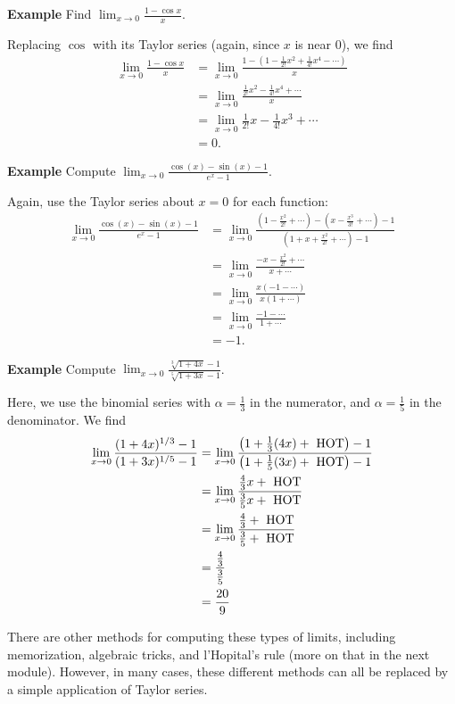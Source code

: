 \documentclass[twoside,openright,titlepage,a4paper]{book}
\begin{document}
\begin{sloppypar}
\textbf{Example} Find $\displaystyle \lim_{x\rightarrow 0} \frac{1-\cos x}{x}$. 
\begin{examplebox}
Replacing $\cos$ with its Taylor series (again, since $x$ is near 0), we find
\begin{align*} 
\lim_{x \rightarrow 0} \frac{1-\cos x}{x} &= \lim_{x \rightarrow 0} \frac{1-\left(1-\frac{1}{2!}x^2 + \frac{1}{4!}x^4 - \dotsb \right)}{x} \\
&= \lim_{x \rightarrow 0} \frac{\frac{1}{2!}x^2 - \frac{1}{4!}x^4 + \dotsb}{x} \\
&= \lim_{x \rightarrow 0} \frac{1}{2!}x - \frac{1}{4!}x^3 + \dotsb \\
&= 0. 
\end{align*}
\end{examplebox}

\textbf{Example} Compute $\displaystyle \lim_{x\rightarrow 0} \frac{\cos(x)-\sin(x)-1}{e^x-1}$. 
\begin{examplebox}
Again, use the Taylor series about $x=0$ for each function: 
\begin{align*}
\lim_{x \rightarrow 0} \frac{\cos(x)-\sin(x)-1}{e^x-1} &= \lim_{x \rightarrow 0} \frac{(1-\frac{x^2}{2!}+\dotsb)-(x-\frac{x^3}{3!}+\dotsb)-1}{(1+x+\frac{x^2}{2!}+\dotsb)-1} \\
&= \lim_{x\rightarrow 0}\frac{-x-\frac{x^2}{2!}+\dotsb}{x+\dotsb} \\
&= \lim_{x \rightarrow 0} \frac{x(-1-\dotsb)}{x(1+\dotsb)} \\
&= \lim_{x \rightarrow 0} \frac{-1-\dotsb}{1+\dotsb} \\
&= -1.
\end{align*}
\end{examplebox}

\textbf{Example} Compute $\displaystyle \lim_{x \rightarrow 0} \frac{\sqrt[3]{1+4x} - 1}{\sqrt[5]{1+3x} - 1}$.
\begin{examplebox}
Here, we use the binomial series with $\alpha = \frac{1}{3}$ in the numerator, and $\alpha = \frac{1}{5}$ in the denominator. We find
\begin{align*}
\lim_{x \rightarrow 0} \frac{(1+4x)^{1/3}- 1}{(1+3x)^{1/5} - 1} &= \lim_{x \rightarrow 0} \frac{\left(1+\frac{1}{3}(4x) + \hbox{ HOT}\right)-1}{\left(1+\frac{1}{5}(3x) + \hbox{ HOT}\right) - 1} \\
&= \lim_{x \rightarrow 0} \frac{\frac{4}{3}x + \hbox{ HOT}}{\frac{3}{5}x + \hbox{ HOT}} \\
&= \lim_{x \rightarrow 0} \frac{\frac{4}{3} + \hbox{ HOT}}{\frac{3}{5} + \hbox{ HOT}} \\
&= \frac{\frac{4}{3}}{\frac{3}{5}} \\
& = \frac{20}{9}
\end{align*}
\end{examplebox}
There are other methods for computing these types of limits, including memorization, algebraic tricks, and l'Hopital's rule (more on that in the next module). However, in many cases, these different methods can all be replaced by a simple application of Taylor series.


\end{sloppypar}
\end{document}
